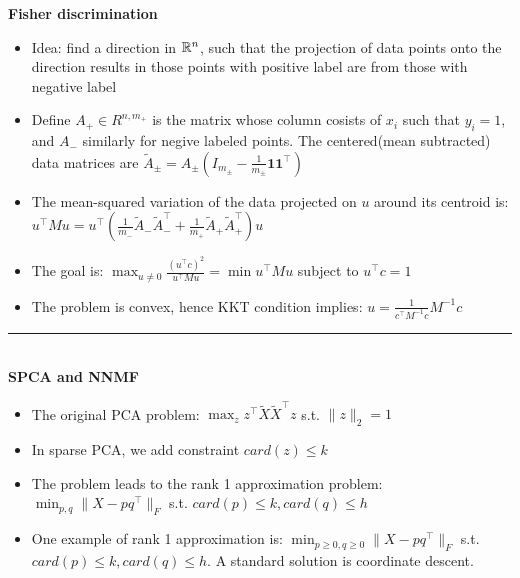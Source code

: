 \documentclass[9pt,landscape]{article}
\newcommand{\uruler}{\rule{\columnwidth}{0.25pt}\\}
\newcommand{\itemizebegin}{\begin{itemize}[noitemsep,topsep=0pt]}
\newcommand{\itemizeend}{\end{itemize}}
\begin{document}
\begin{multicols*}{3}
\textbf{Fisher discrimination}
\itemizebegin
\item Idea: find a direction in $\mathbb{R}^n$, such that the projection of data points onto the direction results in those points with positive label are from those with negative label
\item Define $A_+ \in R^{n,m_+}$ is the matrix whose column cosists of $x_i$ such that $y_i = 1$, and $A_-$ similarly for negive labeled points. The centered(mean subtracted) data matrices are
$\widetilde{A}_{\pm} = A_{\pm} (I_{m_{\pm}} - \frac{1}{m_{\pm}}\mathbf{1} \mathbf{1}^\top)$
\item The mean-squared variation of the data projected on $u$ around its centroid is:
$u^\top M u = u^\top (\frac{1}{m_-} \widetilde{A}_- \widetilde{A}_-^\top + \frac{1}{m_+} \widetilde{A}_+ \widetilde{A}_+^\top )u$
\item The goal is: $\max_{u \ne 0} \frac{(u^\top c)^2}{u^\top M u} = \min u^\top M u$ subject to $u^\top c = 1$
\item The problem is convex, hence KKT condition implies: $u = \frac{1}{c^\top M^{-1} c} M^{-1} c$
\itemizeend
\uruler
\textbf{SPCA and NNMF}
\itemizebegin
\item The original PCA problem: $\max_z z^\top \widetilde{X}\widetilde{X}^\top z $ s.t. $\|z\|_2=1$
\item In sparse PCA, we add constraint $card(z) \le k$
\item The problem leads to the rank 1 approximation problem: $\min_{p,q} \|X - p q^\top \|_F$ s.t.
$card(p) \le k, card(q) \le h$
\item One example of rank 1 approximation is: $\min_{p \ge 0,q \ge 0} \|X - p q^\top \|_F$ s.t.
$card(p) \le k, card(q) \le h$. A standard solution is coordinate descent.
\itemizeend


\end{multicols*}
\end{document}
